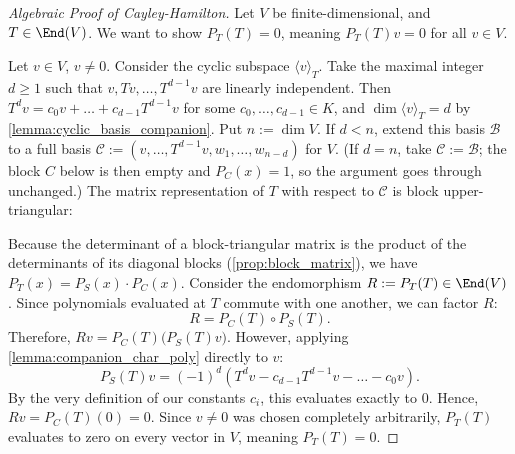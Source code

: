 \begin{proof}[Algebraic Proof of Cayley-Hamilton]
  Let $V$ be finite-di\-men\-sional, and $T \in \End(V)$. We want to show $P_T(T) = 0$, meaning $P_T(T)v = 0$ for all $v \in V$.

  Let $v \in V$, $v \neq 0$. Consider the cyclic subspace $\langle v \rangle_T$. Take the maximal integer $d \ge 1$ such that $v, Tv, \dots, T^{d-1}v$ are linearly independent. Then $T^d v = c_0 v + \dots + c_{d-1}T^{d-1}v$ for some $c_0, \dots, c_{d-1} \in K$, and $\dim \langle v \rangle_T = d$ by \cref{lemma:cyclic_basis_companion}.
  Put $n := \dim V$. If $d < n$, extend this basis $\mathcal{B}$ to a full basis $\mathcal{C} := (v, \dots, T^{d-1}v, w_1, \dots, w_{n-d})$ for $V$. (If $d = n$, take $\mathcal{C} := \mathcal{B}$; the block $C$ below is then empty and $P_C(x) = 1$, so the argument goes through unchanged.) The matrix representation of $T$ with respect to $\mathcal{C}$ is block upper-triangular:
  \begin{center}
  \end{center}
  Because the determinant of a block-triangular matrix is the product of the determinants of its diagonal blocks (\cref{prop:block_matrix}), we have $P_T(x) = P_S(x) \cdot P_C(x)$. Consider the endomorphism $R := P_T(T) \in \End(V)$. Since polynomials evaluated at $T$ commute with one another, we can factor $R$:
  \[
  R = P_C(T) \circ P_S(T).
  \]
  Therefore, $Rv = P_C(T) \Big( P_S(T)v \Big)$.
  However, applying \cref{lemma:companion_char_poly} directly to $v$:
  \[
  P_S(T)v = (-1)^d (T^d v - c_{d-1}T^{d-1}v - \dots - c_0 v).
  \]
  By the very definition of our constants $c_i$, this evaluates exactly to $0$. Hence, $Rv = P_C(T)(0) = 0$. Since $v \neq 0$ was chosen completely arbitrarily, $P_T(T)$ evaluates to zero on every vector in $V$, meaning $P_T(T) = 0$.
\end{proof}

